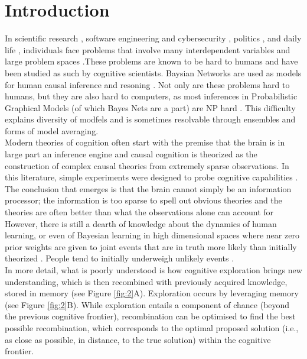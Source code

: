 \section{Introduction}
In scientific research \cite{hisano2013challenges}, software engineering and cybersecurity \cite{littlewood1989predicting,maillart2017given}, politics \cite{clinton2014hard}, and daily life \cite{gerson1986hard}, individuals face problems that involve many interdependent variables and large problem spaces \cite{koller09, Pearl2009CMR}.These problems are known to be hard to humans and have been studied as such by cognitive scientists. Baysian Networks are used as models for human causal inference and resoning \cite{bramley2015staying, castnerForthcoming, Griffiths2008, Pearl88, Spiegler2016, spiegler2015}. Not only are these problems hard to humans, but they are also hard to computers, as most inferences in Probabilistic Graphical Models (of which Bayes Nets are a part) are NP hard \cite{koller09}. This difficulty explains diversity of modfels and is sometimes resolvable through ensembles and forms of model averaging.\\ 

Modern theories of cognition often start with the premise that the brain is in large part an inference engine \cite{Tenenbaum06theory-basedbayesian} and causal cognition is theorized as the construction of complex causal theories from extremely sparse observations. In this literature, simple experiments were designed to probe cognitive capabilities \cite{tenenbaum2001structure}. The conclusion that emerges is that the brain cannot simply be an information processor; the information is too sparse to spell out obvious theories and the theories are often better than what the observations alone can account for \cite{ortoleva2012modeling, Hong04} \\

However, there is still a dearth of knowledge about the dynamics of human learning, or even of Bayesian learning in high dimensional spaces where near zero prior weights are given to joint events that are in truth more likely than initially theorized \cite{ortoleva2012modeling}. People tend to initially underweigh unlikely events \cite{taleb2007}.\\

In more detail, what is poorly understood is how cognitive exploration brings new understanding, which is then recombined with previously acquired knowledge, stored in memory (see Figure \ref{fig:2}A). Exploration occurs by leveraging memory (see Figure \ref{fig:2}B). While exploration entails a component of chance (beyond the previous cognitive frontier), recombination can be optimised to find the best possible recombination, which corresponds to the optimal proposed solution (i.e., as close as possible, in distance, to the true solution) within the cognitive frontier.\\

